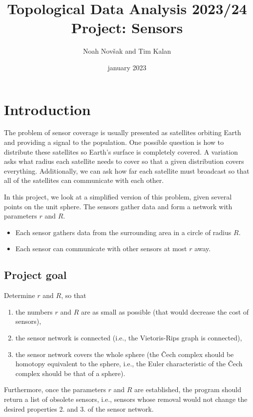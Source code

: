 \documentclass[twocolumn]{article}
\title{Topological Data Analysis 2023/24 \\ Project: Sensors}
\author{Noah Novšak and Tim Kalan}
\date{january 2023}
\begin{document}
\maketitle

\section{Introduction}
The problem of sensor coverage is usually presented as satellites orbiting Earth and providing a signal to the population. One possible question is how to distribute these satellites so Earth's surface is completely covered. A variation asks what radius each satellite needs to cover so that a given distribution covers everything. Additionally, we can ask how far each satellite must broadcast so that all of the satellites can communicate with each other.

In this project, we look at a simplified version of this problem, given several points on the unit sphere. The sensors gather data and form a network with parameters $r$ and $R$.
\begin{itemize}
    \item Each sensor gathers data from the surrounding area in a circle of radius $R$.
    \item Each sensor can communicate with other sensors at most $r$ away.
\end{itemize}

\subsection{Project goal}  
Determine $r$ and $R$, so that
\begin{enumerate}
    \item the numbers $r$ and $R$ are as small as possible (that would decrease the cost of sensors),
    \item the sensor network is connected (i.e., the Vietoris-Rips graph is connected),
    \item the sensor network covers the whole sphere (the Čech complex should be homotopy equivalent to the sphere, i.e., the Euler characteristic of the Čech complex should be that of a sphere).
\end{enumerate}

Furthermore, once the parameters $r$ and $R$ are established, the program should return a list of obsolete sensors, i.e., sensors whose removal would not change the desired properties 2. and 3. of the sensor network.
\end{document}
